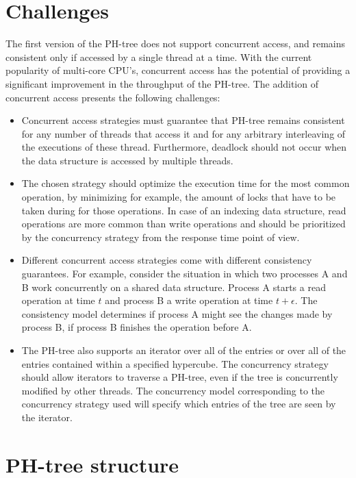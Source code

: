 \documentclass[11pt,a4paper]{globis-book}
\begin{document}
\section{Challenges}
The first version of the PH-tree does not support concurrent access, and remains consistent only if accessed by a single thread at a time. With the current popularity of multi-core CPU's, concurrent access has the potential of providing a significant improvement in the throughput of the PH-tree. The addition of concurrent access presents the following challenges:
\begin{itemize}
    \item Concurrent access strategies must guarantee that PH-tree remains consistent for any number of threads that access it and for any arbitrary interleaving of the executions of these thread. Furthermore, deadlock should not occur when the data structure is accessed by multiple threads.
    \item The chosen strategy should optimize the execution time for the most common operation, by minimizing for example, the amount of locks that have to be taken during for those operations. In case of an indexing data structure, read operations are more common than write operations and should be prioritized by the concurrency strategy from the response time point of view.
    \item Different concurrent access strategies come with different consistency guarantees. For example, consider the situation in which two processes A and B work concurrently on a shared data structure. Process A starts a read operation at time $t$ and process B a write operation at time $t + \epsilon$. The consistency model determines if process A might see the changes made by process B, if process B finishes the operation before A.
    \item The PH-tree also supports an iterator over all of the entries or over all of the entries contained within a specified hypercube. The concurrency strategy should allow iterators to traverse a PH-tree, even if the tree is concurrently modified by other threads. The concurrency model corresponding to the concurrency strategy used will specify which entries of the tree are seen by the iterator.
\end{itemize}

\section{PH-tree structure}
\end{document}
